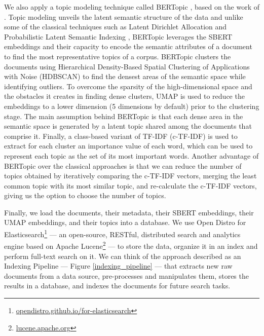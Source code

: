 \documentclass[a4paper]{article}
\begin{document}
We also apply a topic modeling technique called BERTopic \citep{grootendorst2020}, based on the work of \citet{angelov2020}. Topic modeling unveils the latent semantic structure of the data and unlike some of the classical techniques such as Latent Dirichlet Allocation \citep{blei2003} and Probabilistic Latent Semantic Indexing \citet{hofmann1999}, BERTopic leverages the SBERT embeddings and their capacity to encode the semantic attributes of a document to find the most representative topics of a corpus. BERTopic clusters the documents using Hierarchical Density-Based Spatial Clustering of Applications with Noise (HDBSCAN) \citep{mcinnes2017} to find the densest areas of the semantic space while identifying outliers. To overcome the sparsity of the high-dimensional space and the obstacles it creates in finding dense clusters, UMAP is used to reduce the embeddings to a lower dimension (5 dimensions by default) prior to the clustering stage. The main assumption behind BERTopic is that each dense area in the semantic space is generated by a latent topic shared among the documents that comprise it. Finally, a class-based variant of TF-IDF \citep{jones1972} (c-TF-IDF) is used to extract for each cluster an importance value of each word, which can be used to represent each topic as the set of its most important words. Another advantage of BERTopic over the classical approaches is that we can reduce the number of topics obtained by iteratively comparing the c-TF-IDF vectors, merging the least common topic with its most similar topic, and re-calculate the c-TF-IDF vectors, giving us the option to choose the number of topics.

Finally, we load the documents, their metadata, their SBERT embeddings, their UMAP embeddings, and their topics into a database. We use Open Distro for Elasticsearch\footnote{\href{https://opendistro.github.io/for-elasticsearch/}{opendistro.github.io/for-elasticsearch}} — an open-source, RESTful, distributed search and analytics engine based on Apache Lucene\footnote{\href{https://lucene.apache.org/}{lucene.apache.org}} — to store the data, organize it in an index and perform full-text search on it. We can think of the approach described as an Indexing Pipeline — Figure \ref{indexing_pipeline} — that extracts new raw documents from a data source, pre-processes and manipulates them, stores the results in a database, and indexes the documents for future search tasks.
\end{document}
